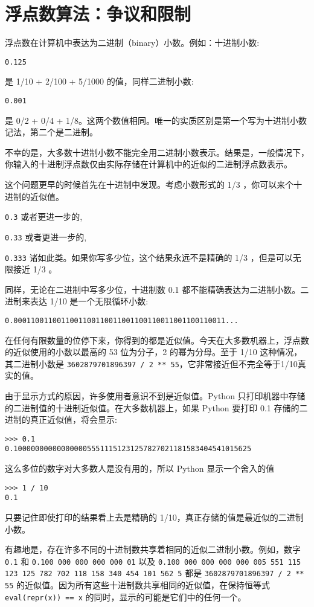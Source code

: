 \chapter{浮点数算法：争议和限制\label{FloatArithmetic}}
浮点数在计算机中表达为二进制（binary）小数。例如：十进制小数:

\verb|0.125|

是 1/10 + 2/100 + 5/1000 的值，同样二进制小数:

\verb|0.001|

是 0/2 + 0/4 + 1/8。这两个数值相同。唯一的实质区别是第一个写为十进制小数记法，第二个是二进制。

不幸的是，大多数十进制小数不能完全用二进制小数表示。结果是，一般情况下，你输入的十进制浮点数仅由实际存储在计算机中的近似的二进制浮点数表示。

这个问题更早的时候首先在十进制中发现。考虑小数形式的 1/3 ，你可以来个十进制的近似值。

\verb|0.3|
或者更进一步的,

\verb|0.33|
或者更进一步的,

\verb|0.333|
诸如此类。如果你写多少位，这个结果永远不是精确的 1/3 ，但是可以无限接近 1/3 。

同样，无论在二进制中写多少位，十进制数 0.1 都不能精确表达为二进制小数。二进制来表达 1/10 是一个无限循环小数:

\verb|0.0001100110011001100110011001100110011001100110011...|

在任何有限数量的位停下来，你得到的都是近似值。今天在大多数机器上，浮点数的近似使用的小数以最高的 53 位为分子，2 的幂为分母。至于 1/10 这种情况，其二进制小数是 \texttt{3602879701896397 / 2 ** 55}，它非常接近但不完全等于1/10真实的值。

由于显示方式的原因，许多使用者意识不到是近似值。Python 只打印机器中存储的二进制值的十进制近似值。在大多数机器上，如果 Python 要打印 0.1 存储的二进制的真正近似值，将会显示:
\begin{lstlisting}
>>> 0.1
0.1000000000000000055511151231257827021181583404541015625
\end{lstlisting}
这么多位的数字对大多数人是没有用的，所以 Python 显示一个舍入的值
\begin{lstlisting}
>>> 1 / 10
0.1
\end{lstlisting}

只要记住即使打印的结果看上去是精确的 1/10，真正存储的值是最近似的二进制小数。

有趣地是，存在许多不同的十进制数共享着相同的近似二进制小数。例如，数字 \texttt{0.1} 和 \texttt{0.100 000 000 000 000 01} 以及 \texttt{0.100 000 000 000 000 005 551 115 123 125 782 702 118 158 340 454 101 562 5} 都是 \texttt{3602879701896397 / 2 ** 55} 的近似值。因为所有这些十进制数共享相同的近似值，在保持恒等式 \texttt{eval(repr(x)) == x} 的同时，显示的可能是它们中的任何一个。


